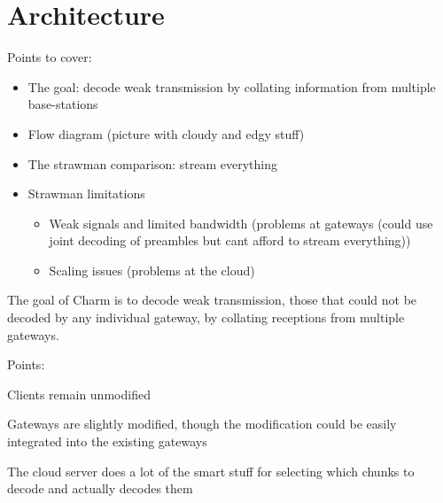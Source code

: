 \section{Architecture}
\label{sec:arch}

{\color{blue} Points to cover:

\begin{itemize}
    \item The goal: decode weak transmission by collating information from multiple base-stations
    \item Flow diagram (picture with cloudy and edgy stuff)
    \item The strawman comparison: stream everything
    \item Strawman limitations
        \begin{itemize}
            \item Weak signals and limited bandwidth (problems at gateways (could use joint decoding of preambles but cant afford to stream everything))
            \item Scaling issues (problems at the cloud)
        \end{itemize}
\end{itemize}
}

The goal of Charm is to decode weak transmission, those that could not be
decoded by any individual gateway, by collating receptions from multiple
gateways.


Points:

Clients remain unmodified

Gateways are slightly modified, though the modification could be easily integrated into the existing gateways

The cloud server does a lot of the smart stuff for selecting which chunks to decode and actually decodes them